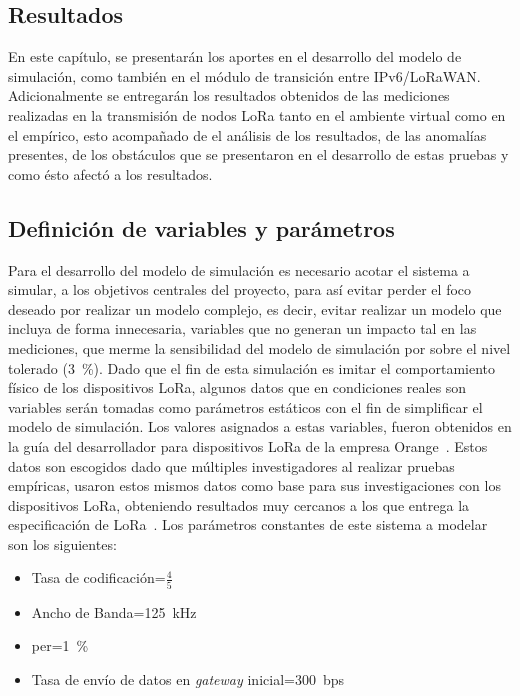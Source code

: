 \begin{justify}
\chapter[Resultados]{Resultados}
\label{ch:resul}
En este capítulo, se presentarán los aportes en el desarrollo del modelo de simulación, como también en el módulo de transición entre IPv6/LoRaWAN. Adicionalmente se entregarán los resultados obtenidos de las mediciones realizadas en la transmisión de nodos LoRa tanto en el ambiente virtual como en el empírico, esto acompañado de el análisis de los resultados, de las anomalías presentes, de los obstáculos que se presentaron en el desarrollo de estas pruebas y como ésto afectó a los resultados.

\section{Definición de variables y parámetros}
\label{sec:param}
Para el desarrollo del modelo de simulación es necesario acotar el sistema a simular, a los objetivos centrales del proyecto, para así evitar perder el foco deseado por realizar un modelo complejo, es decir, evitar realizar un modelo que incluya de forma innecesaria, variables que no generan un impacto tal en las mediciones, que merme la sensibilidad del modelo de simulación por sobre el nivel tolerado (\SI{3}{\percent}). Dado que el fin de esta simulación es imitar el comportamiento físico de los dispositivos LoRa, algunos datos que en condiciones reales son variables serán tomadas como parámetros estáticos con el fin de simplificar el modelo de simulación. Los valores asignados a estas variables, fueron obtenidos en la guía del desarrollador para dispositivos LoRa de la empresa Orange~\cite{orange}. Estos datos son escogidos dado que múltiples investigadores al realizar pruebas empíricas, usaron estos mismos datos como base para sus investigaciones con los dispositivos LoRa, obteniendo resultados muy cercanos a los que entrega la especificación de LoRa~\cite{Juha}. Los parámetros constantes de este sistema a modelar son los siguientes:
\begin{itemize}
\item Tasa de codificación=$\frac{4}{5}$
\item Ancho de Banda=\SI{125}{\kilo\hertz}
\item \gls{per}=\SI{1}{\percent}
\item Tasa de envío de datos en \textit{gateway} inicial=\SI{300}{bps}
\label{para:1}

\end{itemize}
\end{justify}
